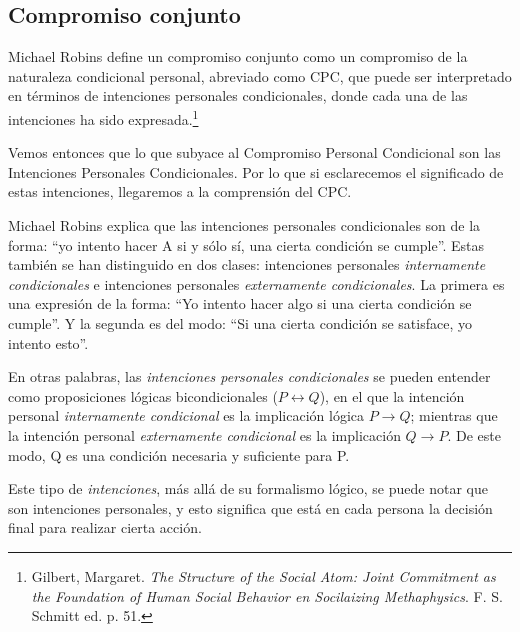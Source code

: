 \documentclass[oneside]{book}
\begin{document}
\subsection{Compromiso conjunto}

Michael Robins define un compromiso conjunto como un compromiso de la naturaleza condicional personal, abreviado como CPC, que puede ser interpretado en términos de intenciones personales condicionales, donde cada una de las intenciones ha sido expresada.\footnote{Gilbert, Margaret. \textit{The Structure of the Social Atom: Joint Commitment as the Foundation of Human Social Behavior en Socilaizing Methaphysics}. F. S. Schmitt ed. p. 51.}

Vemos entonces que lo que subyace al Compromiso Personal Condicional son las Intenciones Personales Condicionales. Por lo que si esclarecemos el significado de estas intenciones, llegaremos a la comprensión  del CPC.

Michael Robins explica que las intenciones personales condicionales son de la forma: “yo intento hacer A si y sólo sí, una cierta condición se cumple”. Estas también se han distinguido en dos clases: intenciones personales \textit{internamente condicionales} e intenciones personales \textit{externamente condicionales}. La primera es una expresión de la forma: “Yo intento hacer algo si una cierta condición se cumple”. Y la segunda es del modo: “Si una cierta condición se satisface, yo intento esto”.

En otras palabras, las \textit{intenciones personales condicionales} se pueden entender como proposiciones lógicas bicondicionales ($P \leftrightarrow Q$), en el que la intención personal \textit{internamente condicional} es la implicación lógica  $P \rightarrow Q$; mientras que la intención personal \textit{externamente condicional} es la implicación $Q \rightarrow P$. De este modo, Q es una condición necesaria y suficiente para P.


Este tipo de \textit{intenciones}, más allá de su formalismo lógico, se puede notar que son intenciones personales, y esto significa que está en cada persona la decisión final para realizar cierta acción. 
\end{document}
